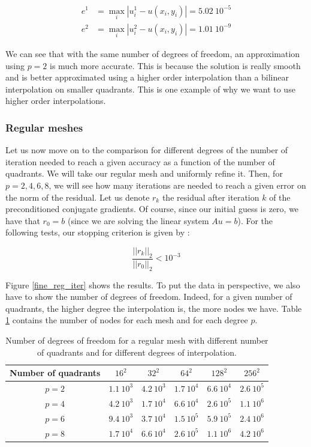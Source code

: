 \begin{align*}
e^1 &= \max_i |u^1_i - u(x_i,y_i)| = 5.02\: 10^{-5}\\
e^2 & = \max_i |u^2_i - u(x_i,y_i)| = 1.01 \: 10^{-9}
\end{align*}

We can see that with the same number of degrees of freedom, an approximation using $p=2$ is much more accurate. This is because the solution is really smooth and is better approximated using a higher order interpolation than a bilinear interpolation on smaller quadrants. This is one example of why we want to use higher order interpolations. 

\subsubsection{Regular meshes}

Let us now move on to the comparison for different degrees of the number of iteration needed to reach a given accuracy as a function of the number of quadrants. We will take our regular mesh and uniformly refine it. Then, for $p=2,4,6,8$, we will see how many iterations are needed to reach a given error on the norm of the residual. Let us denote $r_k$ the residual after iteration $k$ of the preconditioned conjugate gradients. Of course, since our initial guess is zero, we have that $r_0 = b$ (since we are solving the linear system $Au = b$). For the following tests, our stopping criterion is given by :

$$ \frac{||r_k||_2}{||r_0||_2} < 10^{-3}$$

Figure \ref{fine_reg_iter} shows the results. To put the data in perspective, we also have to show the number of degrees of freedom. Indeed, for a given number of quadrants, the higher degree the interpolation is, the more nodes we have. Table \ref{fine_reg_table} contains the number of nodes for each mesh and for each degree $p$.

\begin{table}
\centering
\begin{tabular}{c|ccccc}
\hline
Number of quadrants & $16^2$ & $32^2$ & $64^2$ & $128^2$ & $256^2$\\
\hline
$p=2$ & $1.1\:10^3$ & $4.2\:10^3$ & $1.7\:10^4$ & $6.6\:10^4$ & $2.6\:10^5$\\
$p=4$ & $4.2\:10^3$ & $1.7\:10^4$ & $6.6\:10^4$ & $2.6\:10^5$ & $1.1\:10^6$\\
$p=6$ & $9.4\:10^3$ & $3.7\:10^4$ & $1.5\:10^5$ & $5.9\:10^5$ & $2.4\:10^6$\\
$p=8$ & $1.7\:10^4$ & $6.6\:10^4$ & $2.6\:10^5$ & $1.1\:10^6$ & $4.2\:10^6$\\
\hline
\end{tabular}
\caption{Number of degrees of freedom for a regular mesh with different number of quadrants and for different degrees of interpolation.}
\label{fine_reg_table}
\end{table}


